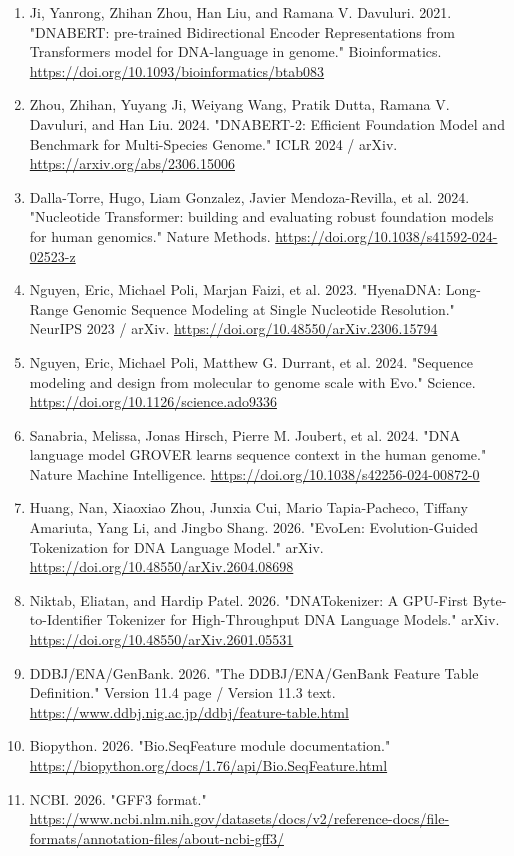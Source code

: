 \documentclass[11pt]{report}
\begin{document}
\begin{enumerate}
\item Ji, Yanrong, Zhihan Zhou, Han Liu, and Ramana V. Davuluri. 2021. "DNABERT: pre-trained Bidirectional Encoder Representations from Transformers model for DNA-language in genome." Bioinformatics. \url{https://doi.org/10.1093/bioinformatics/btab083}
\item Zhou, Zhihan, Yuyang Ji, Weiyang Wang, Pratik Dutta, Ramana V. Davuluri, and Han Liu. 2024. "DNABERT-2: Efficient Foundation Model and Benchmark for Multi-Species Genome." ICLR 2024 / arXiv. \url{https://arxiv.org/abs/2306.15006}
\item Dalla-Torre, Hugo, Liam Gonzalez, Javier Mendoza-Revilla, et al. 2024. "Nucleotide Transformer: building and evaluating robust foundation models for human genomics." Nature Methods. \url{https://doi.org/10.1038/s41592-024-02523-z}
\item Nguyen, Eric, Michael Poli, Marjan Faizi, et al. 2023. "HyenaDNA: Long-Range Genomic Sequence Modeling at Single Nucleotide Resolution." NeurIPS 2023 / arXiv. \url{https://doi.org/10.48550/arXiv.2306.15794}
\item Nguyen, Eric, Michael Poli, Matthew G. Durrant, et al. 2024. "Sequence modeling and design from molecular to genome scale with Evo." Science. \url{https://doi.org/10.1126/science.ado9336}
\item Sanabria, Melissa, Jonas Hirsch, Pierre M. Joubert, et al. 2024. "DNA language model GROVER learns sequence context in the human genome." Nature Machine Intelligence. \url{https://doi.org/10.1038/s42256-024-00872-0}
\item Huang, Nan, Xiaoxiao Zhou, Junxia Cui, Mario Tapia-Pacheco, Tiffany Amariuta, Yang Li, and Jingbo Shang. 2026. "EvoLen: Evolution-Guided Tokenization for DNA Language Model." arXiv. \url{https://doi.org/10.48550/arXiv.2604.08698}
\item Niktab, Eliatan, and Hardip Patel. 2026. "DNATokenizer: A GPU-First Byte-to-Identifier Tokenizer for High-Throughput DNA Language Models." arXiv. \url{https://doi.org/10.48550/arXiv.2601.05531}
\item DDBJ/ENA/GenBank. 2026. "The DDBJ/ENA/GenBank Feature Table Definition." Version 11.4 page / Version 11.3 text. \url{https://www.ddbj.nig.ac.jp/ddbj/feature-table.html}
\item Biopython. 2026. "Bio.SeqFeature module documentation." \url{https://biopython.org/docs/1.76/api/Bio.SeqFeature.html}
\item NCBI. 2026. "GFF3 format." \url{https://www.ncbi.nlm.nih.gov/datasets/docs/v2/reference-docs/file-formats/annotation-files/about-ncbi-gff3/}

\end{enumerate}
\end{document}
